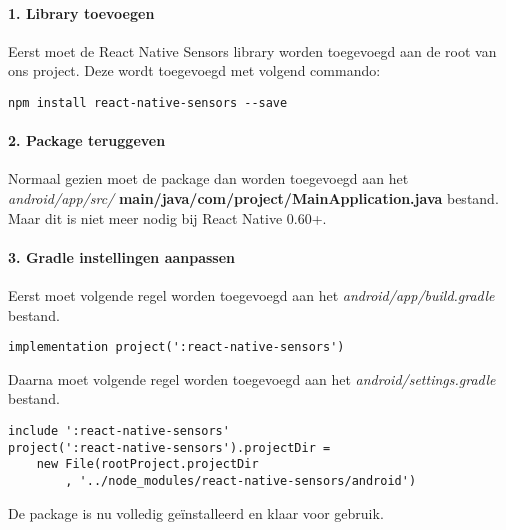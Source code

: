 \paragraph{1. Library toevoegen}
Eerst moet de React Native Sensors library worden toegevoegd aan de root van ons project.
Deze wordt toegevoegd met volgend commando:
\begin{verbatim}
npm install react-native-sensors --save
\end{verbatim}

\paragraph{2. Package teruggeven}
Normaal gezien moet de package dan worden toegevoegd aan het 
\textit{android/app/src/} \textbf{main/java/com/project/MainApplication.java} bestand.
Maar dit is niet meer nodig bij React Native 0.60+.

\paragraph{3. Gradle instellingen aanpassen}
Eerst moet volgende regel worden toegevoegd aan het \textit{android/app/build.gradle} bestand.
\begin{verbatim}
implementation project(':react-native-sensors')
\end{verbatim}
Daarna moet volgende regel worden toegevoegd aan het \textit{android/settings.gradle} bestand.
\begin{verbatim}
include ':react-native-sensors'
project(':react-native-sensors').projectDir = 
    new File(rootProject.projectDir
        , '../node_modules/react-native-sensors/android')
\end{verbatim}
De package is nu volledig geïnstalleerd en klaar voor gebruik.

